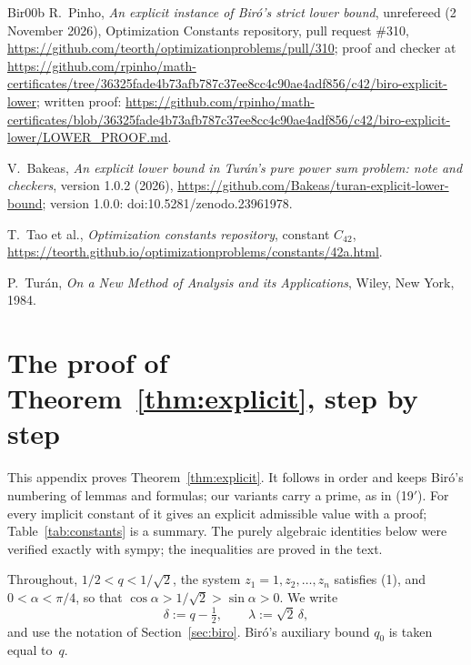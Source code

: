 \documentclass[11pt]{amsart}
\theoremstyle{remark}
\theoremstyle{plain}
\begin{document}
\begin{thebibliography}{Bir00b}
R.~Pinho, \emph{An explicit instance of Bir\'o's strict lower bound}, unrefereed (2 November 2026), Optimization Constants repository, pull request \#310, \url{https://github.com/teorth/optimizationproblems/pull/310}; proof and checker at \url{https://github.com/rpinho/math-certificates/tree/36325fade4b73afb787c37ee8cc4c90ae4adf856/c42/biro-explicit-lower}; written proof: \url{https://github.com/rpinho/math-certificates/blob/36325fade4b73afb787c37ee8cc4c90ae4adf856/c42/biro-explicit-lower/LOWER_PROOF.md}.

V.~Bakeas, \emph{An explicit lower bound in Tur\'an's pure power sum problem: note and checkers}, version 1.0.2 (2026), \url{https://github.com/Bakeas/turan-explicit-lower-bound}; version 1.0.0: doi:10.5281/zenodo.23961978.

T.~Tao et al., \emph{Optimization constants repository}, constant $C_{42}$, \url{https://teorth.github.io/optimizationproblems/constants/42a.html}.

P.~Tur\'an, \emph{On a New Method of Analysis and its Applications}, Wiley, New York, 1984.

\end{thebibliography}

\appendix
\section{The proof of Theorem~\ref{thm:explicit}, step by step}\label{app:proof}

This appendix proves Theorem~\ref{thm:explicit}. It follows \cite{Bir00b} in order and keeps Bir\'o's numbering of lemmas and formulas; our variants carry a prime, as in (19$'$). For every implicit constant of \cite{Bir00b} it gives an explicit admissible value with a proof; Table~\ref{tab:constants} is a summary. The purely algebraic identities below were verified exactly with sympy; the inequalities are proved in the text.

Throughout, $1/2<q<1/\sqrt2$, the system $z_1=1,z_2,\dots,z_n$ satisfies (1), and $0<\alpha<\pi/4$, so that $\cos\alpha>1/\sqrt2>\sin\alpha>0$. We write
\[
\delta:=q-\tfrac12,\qquad \lambda:=\sqrt2\,\delta,
\]
and use the notation of Section~\ref{sec:biro}. Bir\'o's auxiliary bound $q_0$ is taken equal to~$q$.
\end{document}
